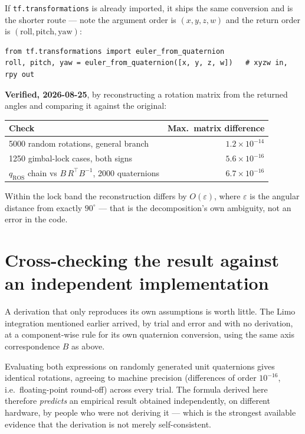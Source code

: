 \documentclass[11pt]{report}
\begin{document}
If \texttt{tf.transformations} is already imported, it ships the same
conversion and is the shorter route --- note the argument order is
$(x,y,z,w)$ and the return order is $(\text{roll},\text{pitch},\text{yaw})$:

\begin{lstlisting}[style=code]
from tf.transformations import euler_from_quaternion
roll, pitch, yaw = euler_from_quaternion([x, y, z, w])   # xyzw in, rpy out
\end{lstlisting}

\textbf{Verified, 2026-08-25}, by reconstructing a rotation matrix from the
returned angles and comparing it against the original:

\begin{center}
\begin{tabular}{@{}lr@{}}
\toprule
Check & Max.\ matrix difference \\
\midrule
5000 random rotations, general branch & $1.2\times10^{-14}$ \\
1250 gimbal-lock cases, both signs & $5.6\times10^{-16}$ \\
$q_{\text{ROS}}$ chain vs $B\,R^{\top}B^{-1}$, 2000 quaternions & $6.7\times10^{-16}$ \\
\bottomrule
\end{tabular}
\end{center}

Within the lock band the reconstruction differs by $O(\varepsilon)$, where
$\varepsilon$ is the angular distance from exactly $90^\circ$ --- that is the
decomposition's own ambiguity, not an error in the code.

\section{Cross-checking the result against an independent implementation}

A derivation that only reproduces its own assumptions is worth little. The
Limo integration mentioned earlier arrived, by trial and error and with no
derivation, at a component-wise rule for its own quaternion conversion, using
the same axis correspondence $B$ as above.

Evaluating both expressions on randomly generated unit quaternions gives
identical rotations, agreeing to machine precision (differences of order
$10^{-16}$, i.e.\ floating-point round-off) across every trial. The formula
derived here therefore \emph{predicts} an empirical result obtained
independently, on different hardware, by people who were not deriving it ---
which is the strongest available evidence that the derivation is not merely
self-consistent.
\end{document}
